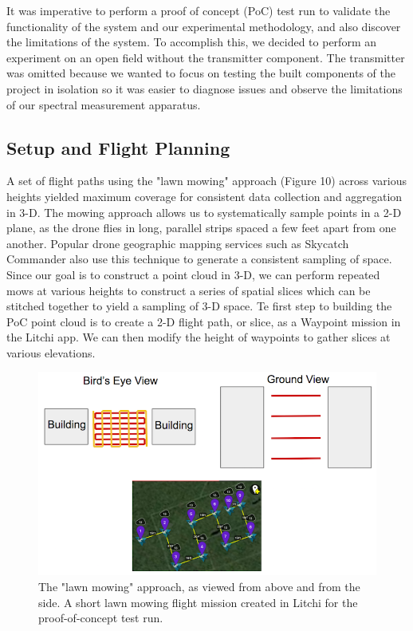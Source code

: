 \documentclass[pageno]{jpaper}
\begin{document}
It was imperative to perform a proof of concept (PoC) test run to validate the functionality of the system and our experimental methodology, and also discover the limitations of the system. To accomplish this, we decided to perform an experiment on an open field without the transmitter component. The transmitter was omitted because we wanted to focus on testing the built components of the project in isolation so it was easier to diagnose issues and observe the limitations of our spectral measurement apparatus. 

\subsection{Setup and Flight Planning}
A set of flight paths using the "lawn mowing" approach (Figure 10) across various heights yielded maximum coverage for consistent data collection and aggregation in 3-D. The mowing approach allows us to systematically sample points in a 2-D plane, as the drone flies in long, parallel strips spaced a few feet apart from one another. Popular drone geographic mapping services such as Skycatch Commander also use this technique to generate a consistent sampling of space. Since our goal is to construct a point cloud in 3-D, we can perform repeated mows at various heights to construct a series of spatial slices which can be stitched together to yield a sampling of 3-D space. Te first step to building the PoC point cloud is to create a 2-D flight path, or slice, as a Waypoint mission in the Litchi app. We can then modify the height of waypoints to gather slices at various elevations.

\begin{figure}[h]
	\caption["Lawn mowing" flight pattern approach]{The "lawn mowing" approach, as viewed from above and from the side. A short lawn mowing flight mission created in Litchi for the proof-of-concept test run.}
	\includegraphics{lawn_mow_PoC}
	\centering
\end{figure}
\end{document}
